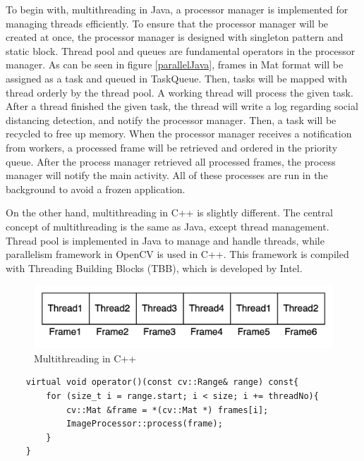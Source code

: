         To begin with, multithreading in Java, a processor manager is implemented for managing threads efficiently.
        To ensure that the processor manager will be created at once,
        the processor manager is designed with singleton pattern and static block.
        Thread pool and queues are fundamental operators in the processor manager.
        As can be seen in figure \ref{parallelJava}, frames in Mat format will be assigned as a task and queued in TaskQueue.
        Then, tasks will be mapped with thread orderly by the thread pool.
        A working thread will process the given task.
        After a thread finished the given task,
        the thread will write a log regarding social distancing detection, and notify the processor manager.
        Then, a task will be recycled to free up memory.
        When the processor manager receives a notification from workers,
        a processed frame will be retrieved and ordered in the priority queue.
        After the process manager retrieved all processed frames,
        the process manager will notify the main activity.
        All of these processes are run in the background to avoid a frozen application.

        On the other hand, multithreading in C++ is slightly different.
        The central concept of multithreading is the same as Java, except thread management.
        Thread pool is implemented in Java to manage and handle threads,
        while parallelism framework in OpenCV is used in C++.
        This framework is compiled with Threading Building Blocks (TBB), which is developed by Intel.

        \begin{figure}[!ht]
            \centering
            \includegraphics[width=5in]{images/chapter3/cpp-parallel.png}
            \caption{Multithreading in C++}
            \label{parallelCpp}
        \end{figure}

\begin{lstlisting}
    virtual void operator()(const cv::Range& range) const{
        for (size_t i = range.start; i < size; i += threadNo){
            cv::Mat &frame = *(cv::Mat *) frames[i];
            ImageProcessor::process(frame);
        }
    }
\end{lstlisting}

